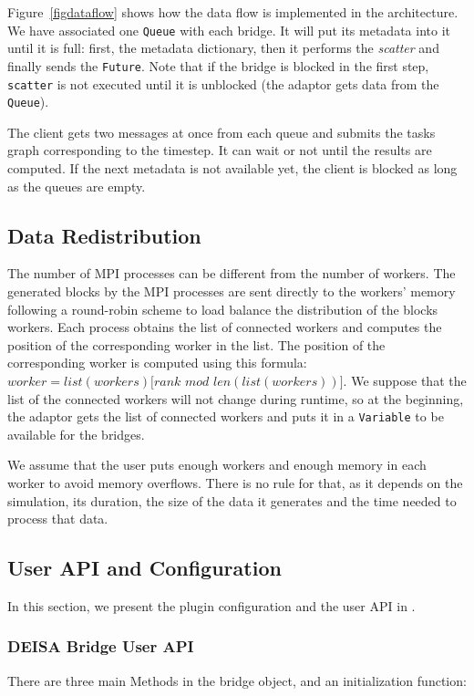Figure~\ref{figdataflow} shows how the data flow is implemented in the \deisa architecture. We have associated one \texttt{Queue} with each bridge. It will put its metadata into it until it is full: first, the metadata dictionary, then it performs the \textit{scatter} and finally sends the \texttt{Future}. Note that if the bridge is blocked in the first step, \texttt{scatter} is not executed until it is unblocked (the adaptor gets data from the \texttt{Queue}).

The client gets two messages at once from each queue and submits the tasks graph corresponding to the timestep. It can wait or not until the results are computed. If the next metadata is not available yet, the client is blocked as long as the queues are empty. 


\subsection{Data Redistribution}
The number of MPI processes can be different from the number of \dask workers.  
The generated blocks by the MPI processes are sent directly to the workers' memory following a round-robin scheme to load balance the distribution of the blocks  workers. 
Each process obtains the list of connected workers and computes the position of the corresponding worker in the list. The position of the corresponding worker is computed using this formula: $worker=list(workers)[rank $  $mod $ $len(list(workers))]$.
We suppose that the list of the connected workers will not change during runtime, so at the beginning, the adaptor gets the list of connected workers and puts it in a \dask \texttt{Variable} to be available for the bridges. 

We assume that the user puts enough workers and enough memory in each worker to avoid memory overflows. There is no rule for that, as it depends on the simulation, its duration, the size of the data it generates and the time needed to process that data. 


\subsection{User API and Configuration}
In this section, we present the \deisa plugin configuration and the user API in \deisa. 

\subsubsection{DEISA Bridge User API}
There are three main Methods in the \deisa bridge object, and an initialization function: 

